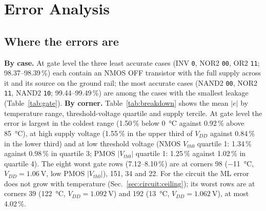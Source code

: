 \section{Error Analysis}\label{sec:errors}

\subsection{Where the errors are}\label{sec:errors:where}
\textbf{By case.} At gate level the three least accurate cases (INV \texttt{0}, NOR2 \texttt{00}, OR2 \texttt{11}; 98.37--98.39\,\%) each contain an NMOS OFF transistor with the full supply across it and its source on the ground rail; the most accurate cases (NAND2 \texttt{00}, NOR2 \texttt{11}, NAND2 \texttt{10}; 99.44--99.49\,\%) are among the cases with the smallest leakage (Table~\ref{tab:gate}).
\textbf{By corner.} Table~\ref{tab:breakdown} shows the mean $|e|$ by temperature range, threshold-voltage quartile and supply tercile. At gate level the error is largest in the coldest range (1.50\,\% below \SI{0}{\celsius} against 0.92\,\% above \SI{85}{\celsius}), at high supply voltage (1.55\,\% in the upper third of $V_{DD}$ against 0.84\,\% in the lower third) and at low threshold voltage (NMOS $V_{th0}$ quartile 1: 1.34\,\% against 0.98\,\% in quartile 3; PMOS $|V_{th0}|$ quartile 1: 1.25\,\% against 1.02\,\% in quartile 4). The eight worst gate rows (7.12--8.10\,\%) are at corners 98 (\SI{-11}{\celsius}, $V_{DD}=\SI{1.06}{\volt}$, low PMOS $|V_{th0}|$), 151, 34 and 22. For the circuit the ML error does not grow with temperature (Sec.~\ref{sec:circuit:ceiling}); its worst rows are at corners 39 (\SI{122}{\celsius}, $V_{DD}=\SI{1.092}{\volt}$) and 192 (\SI{13}{\celsius}, $V_{DD}=\SI{1.062}{\volt}$), at most 4.02\,\%.
